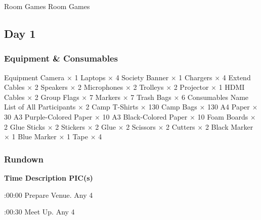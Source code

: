 \bTR\bTD\schetimee{\currentTABLErow}
\eTD\bTD[nr=4] Room Games
\eTD\bTD[nr=4] Room Games
\eTD\eTR


\eTABLEbody
\eTABLE

\pagebreak
\subsection{Day 1}

\subsubsection{Equipment \& Consumables}
\starttabulate[|l|l|]
\NC{}Equipment\NC\NR
\HL
\NC Camera \NC $\times$ 1 \NR
\NC Laptops \NC $\times$ 4 \NR
\NC Society Banner \NC $\times$ 1 \NR
\NC Chargers \NC $\times$ 4 \NR
\NC Extend Cables \NC $\times$ 2 \NR
\NC Speakers \NC $\times$ 2 \NR
\NC Microphones \NC $\times$ 2 \NR
\NC Trolleys \NC $\times$ 2 \NR
\NC Projector \NC $\times$ 1 \NR
\NC HDMI Cables \NC $\times$ 2 \NR
\NC Group Flags \NC $\times$ 7 \NR
\NC Markers \NC $\times$ 7 \NR
\NC Trash Bags \NC $\times$ 6 \NR
\HL
\NR
\NC{}Consumables\NC\NR
\HL
\NC Name List of All Participants \NC $\times$ 2 \NR
\NC Camp T-Shirts \NC $\times$ 130 \NR
\NC Camp Bags \NC $\times$ 130 \NR
\NC A4 Paper \NC $\times$ 30 \NR
\NC A3 Purple-Colored Paper \NC $\times$ 10 \NR
\NC A3 Black-Colored Paper \NC $\times$ 10 \NR
\NC Foam Boards \NC $\times$ 2 \NR
\NC Glue Sticks \NC $\times$ 2 \NR
\NC Stickers \NC $\times$ 2 \NR
\NC Glue \NC $\times$ 2 \NR
\NC Scissors \NC $\times$ 2 \NR
\NC Cutters \NC $\times$ 2 \NR
\NC Black Marker \NC $\times$ 1 \NR
\NC Blue Marker \NC $\times$ 1 \NR
\NC Tape \NC $\times$ 4 \NR
\HL
\stoptabulate

\subsubsection{Rundown}

\setupTABLE[c][1][width=1.25in]
\setupTABLE[c][2][width=3.5in]
\setupTABLE[c][3][width=1.25in]
\bTABLE[split=no]
\bTABLEhead

\bTR\bTH    \bf{Time}
\eTH\bTH    \bf{Description}
\eTH\bTH    \bf{PIC(s)}
\eTH\eTR

\eTABLEhead
\bTABLEbody

\bTR{}:00:00
\eTD\bTD Prepare Venue.
\eTD\bTD Any 4
\eTD\eTR

\bTR{}:00:30
\eTD\bTD Meet Up.
\eTD\bTD Any 4
\eTD\eTR

